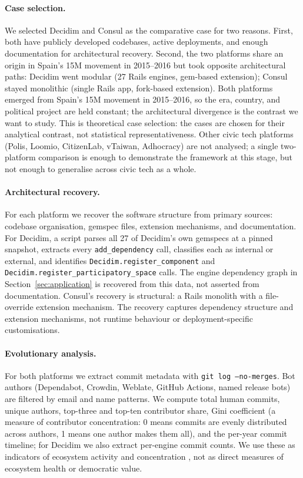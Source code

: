 \documentclass[11pt,a4paper]{article}
\begin{document}
\paragraph{Case selection.}
We selected Decidim and Consul as the comparative case for two reasons. First, both have publicly developed codebases, active deployments, and enough documentation for architectural recovery. Second, the two platforms share an origin in Spain's 15M movement in 2015--2016 but took opposite architectural paths: Decidim went modular (27 Rails engines, gem-based extension); Consul stayed monolithic (single Rails app, fork-based extension). Both platforms emerged from Spain's 15M movement in 2015--2016, so the era, country, and political project are held constant; the architectural divergence is the contrast we want to study. This is theoretical case selection: the cases are chosen for their analytical contrast, not statistical representativeness. Other civic tech platforms (Polis, Loomio, CitizenLab, vTaiwan, Adhocracy) are not analysed; a single two-platform comparison is enough to demonstrate the framework at this stage, but not enough to generalise across civic tech as a whole.

\paragraph{Architectural recovery.}
For each platform we recover the software structure from primary sources: codebase organisation, gemspec files, extension mechanisms, and documentation. For Decidim, a script parses all 27 of Decidim's own gemspecs at a pinned snapshot, extracts every \texttt{add\_dependency} call, classifies each as internal or external, and identifies \texttt{Decidim.register\_component} and \texttt{Decidim.register\_participatory\_space} calls. The engine dependency graph in Section~\ref{sec:application} is recovered from this data, not asserted from documentation. Consul's recovery is structural: a Rails monolith with a file-override extension mechanism. The recovery captures dependency structure and extension mechanisms, not runtime behaviour or deployment-specific customisations.

\paragraph{Evolutionary analysis.}
For both platforms we extract commit metadata with \texttt{git log --no-merges}. Bot authors (Dependabot, Crowdin, Weblate, GitHub Actions, named release bots) are filtered by email and name patterns. We compute total human commits, unique authors, top-three and top-ten contributor share, Gini coefficient (a measure of contributor concentration: 0 means commits are evenly distributed across authors, 1 means one author makes them all), and the per-year commit timeline; for Decidim we also extract per-engine commit counts. We use these as indicators of ecosystem activity and concentration \citep{hassan2008road, manikas2013systematic, jansen2014measuring}, not as direct measures of ecosystem health or democratic value.
\end{document}
